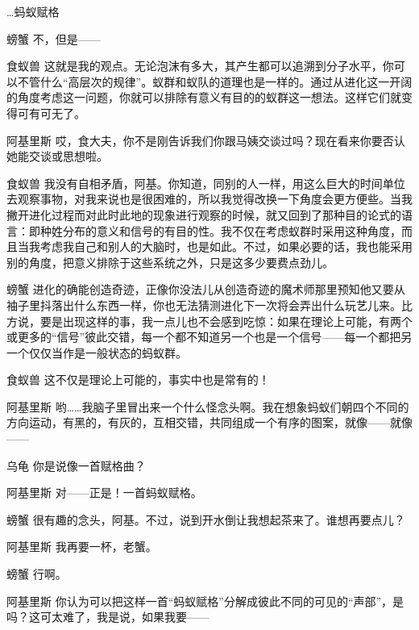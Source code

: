 \begin{dialog}{…蚂蚁赋格}
\begin{dialogue}
\item[螃蟹]不，但是——

\item[食蚁兽]这就是我的观点。无论泡沫有多大，其产生都可以追溯到分子水平，你可以不管什么“高层次的规律”。蚁群和蚁队的道理也是一样的。通过从进化这一开阔的角度考虑这一问题，你就可以排除有意义有目的的蚁群这一想法。这样它们就变得可有可无了。

\item[阿基里斯]哎，食大夫，你不是刚告诉我们你跟马姨交谈过吗？现在看来你要否认她能交谈或思想啦。

\item[食蚁兽]我没有自相矛盾，阿基。你知道，同别的人一样，用这么巨大的时间单位去观察事物，对我来说也是很困难的，所以我觉得改换一下角度会更方便些。当我撇开进化过程而对此时此地的现象进行观察的时候，就又回到了那种目的论式的语言：即种姓分布的意义和信号的有目的性。我不仅在考虑蚁群时采用这种角度，而且当我考虑我自己和别人的大脑时，也是如此。不过，如果必要的话，我也能采用别的角度，把意义排除于这些系统之外，只是这多少要费点劲儿。

\item[螃蟹]进化的确能创造奇迹，正像你没法儿从创造奇迹的魔术师那里预知他又要从袖子里抖落出什么东西一样，你也无法猜测进化下一次将会弄出什么玩艺儿来。比方说，要是出现这样的事，我一点儿也不会感到吃惊：如果在理论上可能，有两个或更多的“信号”彼此交错，每一个都不知道另一个也是一个信号——每一个都把另一个仅仅当作是一般状态的蚂蚁群。

\item[食蚁兽]这不仅是理论上可能的，事实中也是常有的！

\item[阿基里斯]哟……我脑子里冒出来一个什么怪念头啊。我在想象蚂蚁们朝四个不同的方向运动，有黑的，有灰的，互相交错，共同组成一个有序的图案，就像——就像——

\item[乌龟]你是说像一首赋格曲？

\item[阿基里斯]对——正是！一首蚂蚁赋格。

\item[螃蟹]很有趣的念头，阿基。不过，说到开水倒让我想起茶来了。谁想再要点儿？

\item[阿基里斯]我再要一杯，老蟹。

\item[螃蟹]行啊。

\item[阿基里斯]你认为可以把这样一首“蚂蚁赋格”分解成彼此不同的可见的“声部”，是吗？这可太难了，我是说，如果我要——


\end{dialogue}
\end{dialog}
